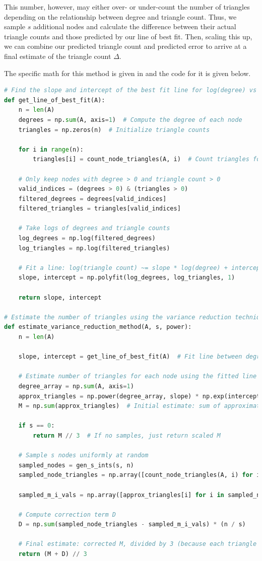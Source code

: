 \documentclass[11pt, margin=1in]{article}
\begin{document}
This number, however, may either over- or under-count the number of triangles depending on the relationship between degree and triangle count.
Thus, we sample $s$ additional nodes and calculate the difference between their actual triangle counts and those predicted by our line of best fit.
Then, scaling this up, we can combine our predicted triangle count and predicted error to arrive at a final estimate of the triangle count $\Delta$.

The specific math for this method is given in  and the code for it is given below.

{
\singlespacing
\begin{lstlisting}[language=Python]
# Find the slope and intercept of the best fit line for log(degree) vs log(triangle count)
def get_line_of_best_fit(A):
    n = len(A)
    degrees = np.sum(A, axis=1)  # Compute the degree of each node
    triangles = np.zeros(n)  # Initialize triangle counts

    for i in range(n):
        triangles[i] = count_node_triangles(A, i)  # Count triangles for each node

    # Only keep nodes with degree > 0 and triangle count > 0
    valid_indices = (degrees > 0) & (triangles > 0)
    filtered_degrees = degrees[valid_indices]
    filtered_triangles = triangles[valid_indices]

    # Take logs of degrees and triangle counts
    log_degrees = np.log(filtered_degrees)
    log_triangles = np.log(filtered_triangles)

    # Fit a line: log(triangle count) ~= slope * log(degree) + intercept
    slope, intercept = np.polyfit(log_degrees, log_triangles, 1)

    return slope, intercept

# Estimate the number of triangles using the variance reduction technique
def estimate_variance_reduction_method(A, s, power):
    n = len(A)

    slope, intercept = get_line_of_best_fit(A)  # Fit line between degree and triangle count

    # Estimate number of triangles for each node using the fitted line
    degree_array = np.sum(A, axis=1)
    approx_triangles = np.power(degree_array, slope) * np.exp(intercept)
    M = np.sum(approx_triangles)  # Initial estimate: sum of approximated triangle counts

    if s == 0:
        return M // 3  # If no samples, just return scaled M

    # Sample s nodes uniformly at random
    sampled_nodes = gen_s_ints(s, n)
    sampled_node_triangles = np.array([count_node_triangles(A, i) for i in sampled_nodes]) # Actual triangle counts

    sampled_m_i_vals = np.array([approx_triangles[i] for i in sampled_nodes]) # Approximated triangle counts

    # Compute correction term D
    D = np.sum(sampled_node_triangles - sampled_m_i_vals) * (n / s)

    # Final estimate: corrected M, divided by 3 (because each triangle is counted 3 times)
    return (M + D) // 3
\end{lstlisting}
}
\end{document}
